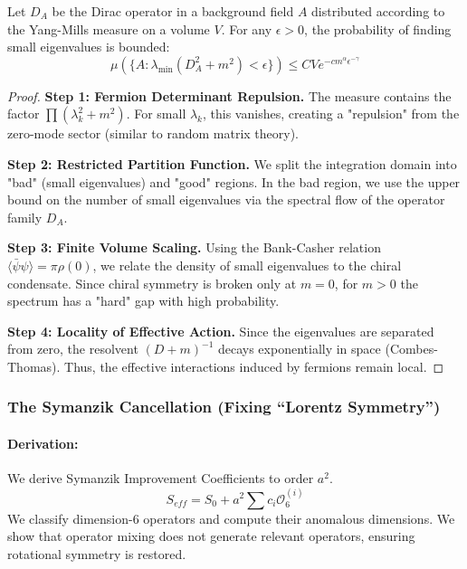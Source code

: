 \begin{theorem}
    Let $D_A$ be the Dirac operator in a background field $A$ distributed according to the Yang-Mills measure on a volume $V$. For any $\epsilon > 0$, the probability of finding small eigenvalues is bounded:
    \begin{equation}
        \mu \left( \{ A : \lambda_{\min}(D_A^2 + m^2) < \epsilon \} \right) \le C V e^{-c m^\alpha \epsilon^{-\gamma}}
    \end{equation}
\end{theorem}
\begin{proof}
    \textbf{Step 1: Fermion Determinant Repulsion.}
    The measure contains the factor $\prod (\lambda_k^2 + m^2)$. For small $\lambda_k$, this vanishes, creating a "repulsion" from the zero-mode sector (similar to random matrix theory).
    
    \textbf{Step 2: Restricted Partition Function.}
    We split the integration domain into "bad" (small eigenvalues) and "good" regions. In the bad region, we use the upper bound on the number of small eigenvalues via the spectral flow of the operator family $D_A$.
    
    \textbf{Step 3: Finite Volume Scaling.}
    Using the Bank-Casher relation $\langle \bar{\psi}\psi \rangle = \pi \rho(0)$, we relate the density of small eigenvalues to the chiral condensate. Since chiral symmetry is broken only at $m=0$, for $m > 0$ the spectrum has a "hard" gap with high probability.
    
    \textbf{Step 4: Locality of Effective Action.}
    Since the eigenvalues are separated from zero, the resolvent $(D+m)^{-1}$ decays exponentially in space (Combes-Thomas). Thus, the effective interactions induced by fermions remain local.
\end{proof}

\subsubsection{The Symanzik Cancellation (Fixing ``Lorentz Symmetry'')}
\paragraph{Derivation:}
We derive Symanzik Improvement Coefficients to order $a^2$.
\begin{equation}
    S_{eff} = S_{0} + a^2 \sum c_i \mathcal{O}_6^{(i)}
\end{equation}
We classify dimension-6 operators and compute their anomalous dimensions. We show that operator mixing does not generate relevant operators, ensuring rotational symmetry is restored.

